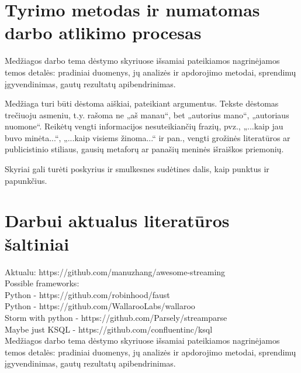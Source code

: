 \documentclass{VUMIFPSbakalaurinis}
\begin{document}
\section{Tyrimo metodas ir numatomas darbo atlikimo procesas}
Medžiagos darbo tema dėstymo skyriuose išsamiai pateikiamos nagrinėjamos temos
detalės: pradiniai duomenys, jų analizės ir apdorojimo metodai, sprendimų
įgyvendinimas, gautų rezultatų apibendrinimas.

Medžiaga turi būti dėstoma aiškiai, pateikiant argumentus. Tekste dėstomas
trečiuoju asmeniu, t.y. rašoma ne „aš manau“, bet „autorius mano“, „autoriaus
nuomone“. Reikėtų vengti informacijos nesuteikiančių frazių, pvz., „...kaip jau
buvo minėta...“, „...kaip visiems žinoma...“ ir pan., vengti grožinės
literatūros ar publicistinio stiliaus, gausių metaforų ar panašių meninės
išraiškos priemonių.

Skyriai gali turėti poskyrius ir smulkesnes sudėtines dalis, kaip punktus ir
papunkčius.

\section{Darbui aktualus literatūros šaltiniai}
Aktualu: https://github.com/manuzhang/awesome-streaming \\
Possible frameworks: \\
 Python - https://github.com/robinhood/faust \\
 Python - https://github.com/WallarooLabs/wallaroo \\
 Storm with python - https://github.com/Parsely/streamparse \\
 Maybe just KSQL - https://github.com/confluentinc/ksql \\
Medžiagos darbo tema dėstymo skyriuose išsamiai pateikiamos nagrinėjamos temos
detalės: pradiniai duomenys, jų analizės ir apdorojimo metodai, sprendimų
įgyvendinimas, gautų rezultatų apibendrinimas.
\end{document}
